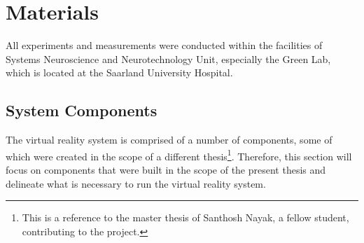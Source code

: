 
\section{Materials}
All experiments and measurements were conducted within the facilities of Systems Neuroscience and Neurotechnology Unit, especially the Green Lab, which is located at the Saarland University Hospital. 

\subsection{System Components}
The virtual reality system is comprised of a number of components, some of which were created in the scope of a different thesis\footnote{This is a reference to the master thesis of Santhosh Nayak, a fellow student, contributing to the project.}. Therefore, this section will focus on components that were built in the scope of the present thesis and delineate what is necessary to run the virtual reality system.
  
